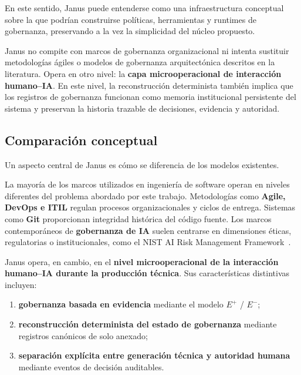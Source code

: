 \documentclass[conference]{IEEEtran}
\begin{document}
En este sentido, Janus puede entenderse como una infraestructura conceptual sobre la que podrían construirse políticas, herramientas y runtimes de gobernanza, preservando a la vez la simplicidad del núcleo propuesto.

Janus no compite con marcos de gobernanza organizacional ni intenta sustituir metodologías ágiles o modelos de gobernanza arquitectónica descritos en la literatura. Opera en otro nivel: la \textbf{capa microoperacional de interacción humano--IA}. En este nivel, la reconstrucción determinista también implica que los registros de gobernanza funcionan como memoria institucional persistente del sistema y preservan la historia trazable de decisiones, evidencia y autoridad.

\subsection{Comparación conceptual}
Un aspecto central de Janus es cómo se diferencia de los modelos existentes.

La mayoría de los marcos utilizados en ingeniería de software operan en niveles diferentes del problema abordado por este trabajo. Metodologías como \textbf{Agile, DevOps e ITIL} regulan procesos organizacionales y ciclos de entrega. Sistemas como \textbf{Git} proporcionan integridad histórica del código fuente. Los marcos contemporáneos de \textbf{gobernanza de IA} suelen centrarse en dimensiones éticas, regulatorias o institucionales, como el NIST AI Risk Management Framework~\cite{nist2023}.

Janus opera, en cambio, en el \textbf{nivel microoperacional de la interacción humano--IA durante la producción técnica}. Sus características distintivas incluyen:
\begin{enumerate}
  \item \textbf{gobernanza basada en evidencia} mediante el modelo $E^{+}$ / $E^{-}$;
  \item \textbf{reconstrucción determinista del estado de gobernanza} mediante registros canónicos de solo anexado;
  \item \textbf{separación explícita entre generación técnica y autoridad humana} mediante eventos de decisión auditables.
\end{enumerate}
\end{document}
